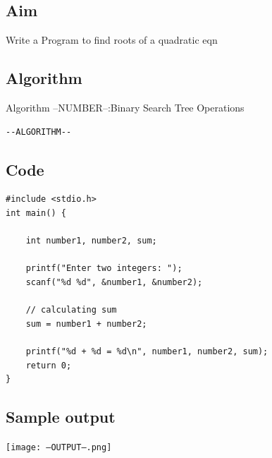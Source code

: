 \documentclass[14pt, letterpaper]{article}
\theoremstyle{mytheor}
\begin{document}
\subsection{Aim}
Write a Program to find roots of a quadratic eqn

\subsection{Algorithm}
\hline 
\vspace{0.1cm}
\hspace{0.2 cm}Algorithm --NUMBER--:Binary Search Tree Operations
\vspace{0.1cm}
\hline
\begin{verbatim}
--ALGORITHM--
\end{verbatim}
\newpage

\subsection{Code}
\begin{lstlisting}[label={list:first}]
#include <stdio.h>
int main() {    

    int number1, number2, sum;
    
    printf("Enter two integers: ");
    scanf("%d %d", &number1, &number2);

    // calculating sum
    sum = number1 + number2;      
    
    printf("%d + %d = %d\n", number1, number2, sum);
    return 0;
}
\end{lstlisting}

\subsection{Sample output}
\texttt{[image: --OUTPUT--.png]}

\newpage
\end{document}
